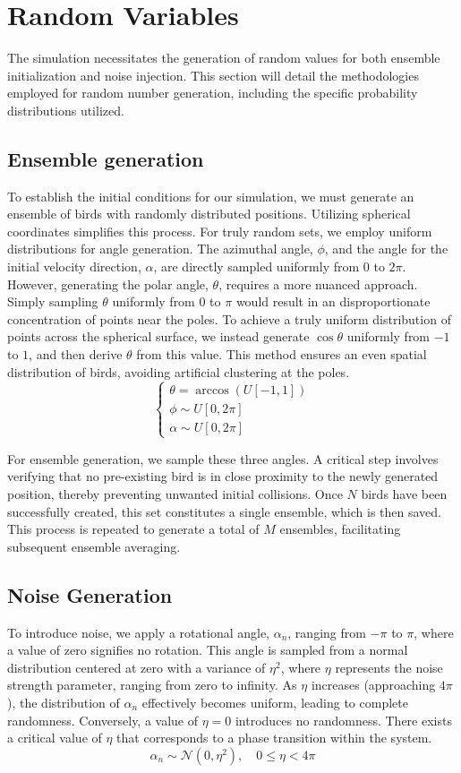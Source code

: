 \documentclass[12pt,a4paper]{article}
\begin{document}
\section{Random Variables}
The simulation necessitates the generation of random values for both ensemble initialization and noise injection. This section will detail the methodologies employed for random number generation, including the specific probability distributions utilized.

\subsection{Ensemble generation}
To establish the initial conditions for our simulation, we must generate an ensemble of birds with randomly distributed positions. Utilizing spherical coordinates simplifies this process. For truly random sets, we employ uniform distributions for angle generation. The azimuthal angle, \(\phi\), and the angle for the initial velocity direction, \(\alpha\), are directly sampled uniformly from \(0\) to \(2\pi\). However, generating the polar angle, \(\theta\), requires a more nuanced approach. Simply sampling \(\theta\) uniformly from \(0\) to \(\pi\) would result in an disproportionate concentration of points near the poles. To achieve a truly uniform distribution of points across the spherical surface, we instead generate \(\cos\theta\) uniformly from \(-1\) to \(1\), and then derive \(\theta\) from this value. This method ensures an even spatial distribution of birds, avoiding artificial clustering at the poles.
\[
\left\{
\begin{array}{l}
    \theta = \arccos(U[-1, 1]) \\
\phi \sim U[0, 2\pi] \\
\alpha \sim U[0, 2\pi]

\end{array}
\right.
\]

For ensemble generation, we sample these three angles. A critical step involves verifying that no pre-existing bird is in close proximity to the newly generated position, thereby preventing unwanted initial collisions. Once \(N\) birds have been successfully created, this set constitutes a single ensemble, which is then saved. This process is repeated to generate a total of \(M\) ensembles, facilitating subsequent ensemble averaging.

\subsection{Noise Generation}
To introduce noise, we apply a rotational angle, \(\alpha_n\), ranging from \(-\pi\) to \(\pi\), where a value of zero signifies no rotation. This angle is sampled from a normal distribution centered at zero with a variance of \(\eta^2\), where \(\eta\) represents the noise strength parameter, ranging from zero to infinity. As \(\eta\) increases (approaching \(4\pi\)), the distribution of \(\alpha_n\) effectively becomes uniform, leading to complete randomness. Conversely, a value of \(\eta = 0\) introduces no randomness. There exists a critical value of \(\eta\) that corresponds to a phase transition within the system.
\[
\alpha_n \sim \mathcal{N}(0, \eta^2), \quad 0 \le \eta < 4\pi
\]
\end{document}
